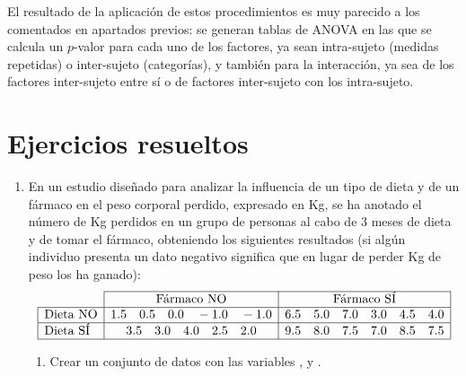 El resultado de la aplicación de estos procedimientos es muy parecido a los comentados en apartados previos: se generan
tablas de ANOVA en las que se calcula un $p$-valor para cada uno de los factores, ya sean intra-sujeto (medidas
repetidas) o inter-sujeto (categorías), y también para la interacción, ya sea de los factores inter-sujeto entre sí o de
factores inter-sujeto con los intra-sujeto.

\clearpage
\newpage


\section{Ejercicios resueltos}
\begin{enumerate}[leftmargin=*] \item En un estudio diseñado para analizar la influencia de un tipo de dieta y de un
fármaco en el peso corporal perdido, expresado en Kg, se ha anotado el número de Kg perdidos en un grupo de personas al
cabo de 3 meses de dieta y de tomar el fármaco, obteniendo los siguientes resultados (si algún individuo presenta un
dato negativo significa que en lugar de perder Kg de peso los ha ganado):
\[
\begin{array}{|l|c|c|}
\cline{2-3}
\multicolumn{1}{l|}{} & \text{Fármaco NO} & \text{Fármaco SÍ} \\
\hline
\text{Dieta NO} & 1.5\quad 0.5\quad 0.0\quad -1.0\quad -1.0 & 6.5\quad 5.0\quad 7.0\quad 3.0\quad 4.5\quad 4.0 \\
\hline
\text{Dieta SÍ} & 3.5\quad 3.0\quad 4.0\quad 2.5\quad 2.0 & 9.5\quad 8.0\quad 7.5\quad 7.0\quad 8.5\quad 7.5 \\
\hline
\end{array}
\]

\begin{enumerate}
\item Crear un conjunto de datos  con las variables , 
y .


\end{enumerate}
\end{enumerate}
